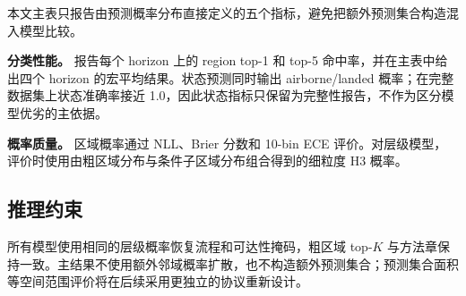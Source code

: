 本文主表只报告由预测概率分布直接定义的五个指标，避免把额外预测集合构造混入模型比较。

\textbf{分类性能。}
报告每个 horizon 上的 region top-1 和 top-5 命中率，并在主表中给出四个 horizon 的宏平均结果。状态预测同时输出 airborne/landed 概率；在完整数据集上状态准确率接近 1.0，因此状态指标只保留为完整性报告，不作为区分模型优劣的主依据。

\textbf{概率质量。}
区域概率通过 NLL、Brier 分数和 10-bin ECE 评价。对层级模型，评价时使用由粗区域分布与条件子区域分布组合得到的细粒度 H3 概率。

\subsection{推理约束}

所有模型使用相同的层级概率恢复流程和可达性掩码，粗区域 top-$K$ 与方法章保持一致。主结果不使用额外邻域概率扩散，也不构造额外预测集合；预测集合面积等空间范围评价将在后续采用更独立的协议重新设计。
